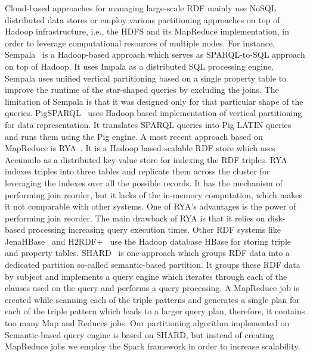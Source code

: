Cloud-based approaches for managing large-scale \gls{RDF} mainly use NoSQL distributed data stores or employ various partitioning approaches on top of Hadoop infrastructure, i.e., the \gls{HDFS} and its MapReduce implementation, in order to leverage computational resources of multiple nodes. 
For instance, Sempala~\cite{Schatzle2014Sempala} is a Hadoop-based approach which serves as SPARQL-to-SQL approach on top of Hadoop.
It uses Impala as a distributed SQL processing engine. 
Sempala uses unified vertical partitioning based on a single property table to improve the runtime of the star-shaped queries by excluding the joins. 
The limitation of Sempala is that it was designed only for that particular shape of the queries.
PigSPARQL~\cite{Schatzle2011PMS} uses Hadoop based implementation of vertical partitioning for data representation. 
It translates \gls{SPARQL} queries into Pig LATIN queries and runs them using the Pig engine.
A most recent approach based on MapReduce is RYA~\cite{Punnoose2012Rya}.
It is a Hadoop based scalable \gls{RDF} store which uses Accumulo as a distributed key-value store for indexing the \gls{RDF} triples.
RYA indexes triples into three tables and replicate them across the cluster for leveraging the indexes over all the possible records.
It has the mechanism of performing join reorder, but it lacks of the in-memory computation, which makes it not comparable with other systems.
One of RYA's advantages is the power of performing join reorder. 
The main drawback of RYA is that it relies on disk-based processing increasing query execution times.
Other \gls{RDF} systems like JenaHBase~\cite{KhadilkarKTC2012} and H2RDF+~\cite{PapailiouKTKK13} use the Hadoop database HBase for storing triple and property tables.
SHARD~\cite{Rohloff2010SHARD} is one approach which groups \gls{RDF} data into a dedicated partition so-called semantic-based partition.  
It groups these \gls{RDF} data by subject and implements a query engine which iterates through each of the clauses used on the query and performs a query processing. 
A MapReduce job is created while scanning each of the triple patterns and generates a single plan for each of the triple pattern which leads to a larger query plan, therefore, it contains too many Map and Reduces jobs. 
Our partitioning algorithm implemented on Semantic-based query engine is based on SHARD, but instead of creating MapReduce jobs we employ the Spark framework in order to increase scalability.

